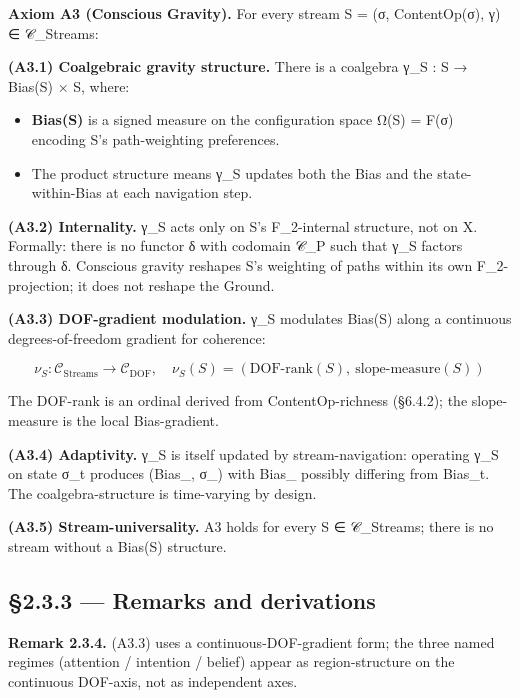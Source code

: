 \documentclass[11pt, openany]{book}
\begin{document}
\textbf{Axiom A3 (Conscious Gravity).} For every stream S = (σ, ContentOp(σ), γ) ∈ 𝒞\_\allowbreak{}Streams:

\textbf{(A3.1) Coalgebraic gravity structure.} There is a coalgebra γ\_\allowbreak{}S : S → Bias(S) × S, where:

\begin{itemize}
\item \textbf{Bias(S)} is a signed measure on the configuration space Ω(S) = F(σ) encoding S's path-weighting preferences.
\item The product structure means γ\_\allowbreak{}S updates both the Bias and the state-within-Bias at each navigation step.
\end{itemize}

\textbf{(A3.2) Internality.} γ\_\allowbreak{}S acts only on S's F\_\allowbreak{}2-internal structure, not on X. Formally: there is no functor δ with codomain 𝒞\_\allowbreak{}P such that γ\_\allowbreak{}S factors through δ. Conscious gravity reshapes S's weighting of paths within its own F\_\allowbreak{}2-projection; it does not reshape the Ground.

\textbf{(A3.3) DOF-gradient modulation.} γ\_\allowbreak{}S modulates Bias(S) along a continuous degrees-of-freedom gradient for coherence:

\[
\nu_S : \mathcal{C}_\mathrm{Streams} \to \mathcal{C}_\mathrm{DOF},\quad \nu_S(S) = (\mathrm{DOF\text{-}rank}(S),\ \mathrm{slope\text{-}measure}(S))
\]

The DOF-rank is an ordinal derived from ContentOp-richness (§6.4.2); the slope-measure is the local Bias-gradient.

\textbf{(A3.4) Adaptivity.} γ\_\allowbreak{}S is itself updated by stream-navigation: operating γ\_\allowbreak{}S on state σ\_\allowbreak{}t produces (Bias\_, σ\_) with Bias\_ possibly differing from Bias\_\allowbreak{}t. The coalgebra-structure is time-varying by design.

\textbf{(A3.5) Stream-universality.} A3 holds for every S ∈ 𝒞\_\allowbreak{}Streams; there is no stream without a Bias(S) structure.

\subsection{§2.3.3 --- Remarks and derivations}

\textbf{Remark 2.3.4.} (A3.3) uses a continuous-DOF-gradient form; the three named regimes (attention / intention / belief) appear as region-structure on the continuous DOF-axis, not as independent axes.
\end{document}
